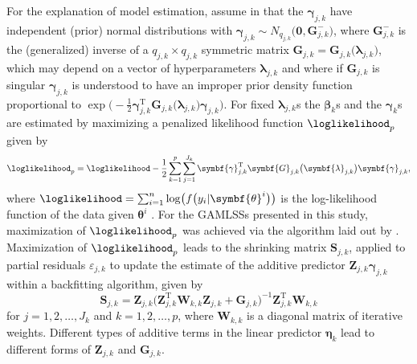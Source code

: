 For the explanation of model estimation, assume in  that the \(\symbf{\gamma}_{j, k}\) have independent (prior) normal distributions with \(\symbf{\gamma}_{j, k} \sim N_{q_{j, k}}\bigl(\symbf{0}, \symbf{G}_{j, k}^-\bigr)\), where \(\symbf{G}_{j, k}^-\) is the (generalized) inverse of a \(q_{j, k} \times q_{j, k}\) symmetric matrix \(\symbf{G}_{j, k} = \symbf{G}_{j, k}\bigl(\symbf{\lambda}_{j, k}\bigr)\), which may depend on a vector of hyperparameters \(\symbf{\lambda}_{j, k}\) and where if \(\symbf{G}_{j, k}\) is singular \(\symbf{\gamma}_{j, k}\) is understood to have an improper prior density function proportional to \(\exp\bigl(-\frac{1}{2} \symbf{\gamma}_{j, k}^{\text{T}} \symbf{G}_{j, k}\bigl(\symbf{\lambda}_{j, k}\bigr) \symbf{\gamma}_{j, k}\bigr)\).  For fixed \(\symbf{\lambda}_{j, k}\)s the \(\symbf{\beta}_k\)s and the \(\symbf{\gamma}_k\)s are estimated by maximizing a penalized likelihood function \(\loglikelihood_p\) given by
\begin{equation}
  \label{eq:GAMLSSRigbyStasinopoulos2005PenalizedLikelihood}
  \loglikelihood_p = \loglikelihood - \frac{1}{2} \sum_{k = 1}^p \sum_{j = 1}^{J_k} \symbf{\gamma}_{j, k}^{\text{T}} \symbf{G}_{j, k}\bigl(\symbf{\lambda}_{j, k}\bigr) \symbf{\gamma}_{j, k},
\end{equation}
where \(\loglikelihood = \sum_{i = 1}^n \log\bigl(f\bigl(y_i | \symbf{\theta}^i\bigr)\bigr)\) is the log-likelihood function of the data given \(\symbf{\theta}^i\) \parencite{Rigby2005}.  For the GAMLSSs presented in this study, maximization of \(\loglikelihood_p\) was achieved via the algorithm laid out by \textcite{Rigby1996}.  Maximization of \(\loglikelihood_p\) leads to the shrinking matrix \(\symbf{S}_{j, k}\), applied to partial residuals \(\varepsilon_{j, k}\) to update the estimate of the additive predictor \(\symbf{Z}_{j, k} \symbf{\gamma}_{j, k}\) within a backfitting algorithm, given by
\begin{equation}
  \label{eq:GAMLSSRigbyStasinopoulos2005BackfittingAlgorithm}
  \symbf{S}_{j, k} = \symbf{Z}_{j, k} \bigl(\symbf{Z}_{j, k}^{\text{T}} \symbf{W}_{k, k} \symbf{Z}_{j, k} + \symbf{G}_{j, k}\bigr)^{-1} \symbf{Z}_{j, k}^{\text{T}} \symbf{W}_{k, k}
\end{equation}
for \(j = 1, 2, \ldots, J_k\) and \(k = 1, 2, \ldots, p\), where \(\symbf{W}_{k, k}\) is a diagonal matrix of iterative weights.  Different types of additive terms in the linear predictor \(\symbf{\eta}_k\) lead to different forms of \(\symbf{Z}_{j, k}\) and \(\symbf{G}_{j, k}\).

